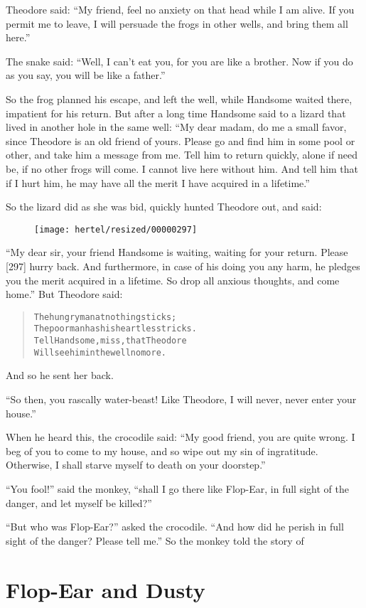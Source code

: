 \documentclass[article, twoside, 10pt]{memoir}
\renewenvironment{verbatim}{%
\begin{quote}%
\vskip -10pt%
\begin{alltt}\normalfont\small}{\end{alltt}%
\end{quote}%
\vskip -10pt
} %
\begin{document}
Theodore said:
``My friend, feel no anxiety on that head while I am alive. If you permit me to leave, I will persuade the frogs in other wells, and bring them all here.''

The snake said:
``Well, I can't eat you, for you are like a brother. Now if you do as you say, you will be like a father.''

So the frog planned his escape, and left the well, while Handsome
waited there, impatient for his return. But after a long time
Handsome said to a lizard that lived in another hole in the same
well:
``My dear madam, do me a small favor, since Theodore is an old friend of yours. Please go and find him in some pool or other, and take him a message from me. Tell him to return quickly, alone if need be, if no other frogs will come. I cannot live here without him. And tell him that if I hurt him, he may have all the merit I have acquired in a lifetime.''

So the lizard did as she was bid, quickly hunted Theodore out, and
said:
\begin{figure}[p]\texttt{[image: hertel/resized/00000297]}\end{figure}``My dear sir, your friend Handsome is waiting, waiting for your return. Please [297] hurry back. And furthermore, in case of his doing you any harm, he pledges you the merit acquired in a lifetime. So drop all anxious thoughts, and come home.''
But Theodore said:

\begin{verbatim}
The hungry man at nothing sticks;
The poor man has his heartless tricks.
Tell Handsome, miss, that Theodore
Will see him in the well no more.
\end{verbatim}
And so he sent her back.

``So then, you rascally water-beast! Like Theodore, I will never, never enter your house.''

When he heard this, the crocodile said:
``My good friend, you are quite wrong. I beg of you to come to my house, and so wipe out my sin of ingratitude. Otherwise, I shall starve myself to death on your doorstep.''

``You fool!'' said the monkey,
``shall I go there like Flop-Ear, in full sight of the danger, and let myself be killed?''

``But who was Flop-Ear?'' asked the crocodile.
``And how did he perish in full sight of the danger? Please tell me.''
So the monkey told the story of

\chapter{Flop-Ear and Dusty}
\end{document}
